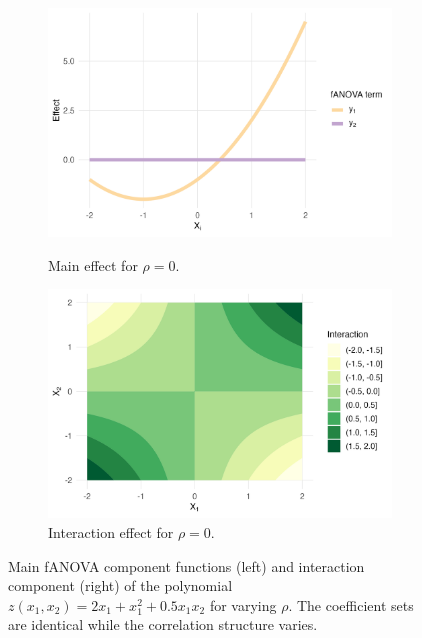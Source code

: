 \begin{figure}[htpb]
    \begin{subfigure}[t]{\textwidth}
        \centering
        \begin{minipage}[t]{0.49\textwidth}
            \includegraphics[width=\textwidth]{images/experiment_section/full_a1p20_a2p00_a11p10_a22p00_a12p05_rhop00_main.png}
            \caption{Main effect for $\rho = 0$.}
        \end{minipage}%
        \hfill
        \begin{minipage}[t]{0.49\textwidth}
            \includegraphics[width=\textwidth]{images/experiment_section/full_a1p20_a2p00_a11p10_a22p00_a12p05_rhop00_interaction.png}
            \caption{Interaction effect for $\rho = 0$.}
        \end{minipage}
    \end{subfigure}
    \caption{Main fANOVA component functions (left) and interaction component (right) of the polynomial $z(x_1, x_2) = 2x_1 + x_1^2 + 0.5 x_1 x_2$ for varying $\rho$. The coefficient sets are identical while the correlation structure varies.}
    \label{fig:all_pair_01}
\end{figure}

